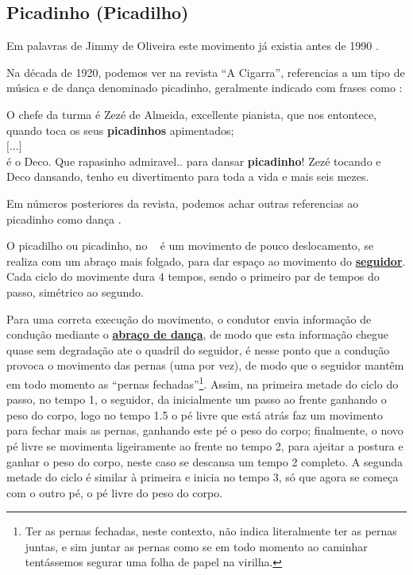 \subsection{ Picadinho (Picadilho)}


Em palavras de Jimmy de Oliveira este movimento já existia antes de 1990 \cite{sambafunkeadoJimmyDeOliveiraPart1}.

Na década de 1920, podemos ver na revista ``A Cigarra'', 
referencias a um tipo de música e de dança denominado picadinho,
geralmente indicado com frases como \cite[pp. 13]{picadinho1}:
\begin{citando}
O chefe da turma é Zezé de Almeida, excellente pianista,
que nos entontece, quando toca os seus \textbf{picadinhos} apimentados;~\\
$[$...$]$~\\
é o Deco. Que rapasinho admiravel.. para dansar \textbf{picadinho}! 
Zezé tocando e Deco dansando, tenho eu divertimento 
para toda a vida e mais seis mezes.
\end{citando}
Em números posteriores da revista, 
podemos achar outras referencias ao picadinho como dança \cite[pp. 52]{picadinho2} \cite[pp. 49]{picadinho3}.

O picadilho ou picadinho, no \AnoLivro~ é um movimento de pouco deslocamento, 
se realiza com um abraço mais folgado, 
para dar espaço ao movimento do \hyperref[def:Seguidor]{\textbf{seguidor}}.
Cada ciclo do movimente dura 4 tempos, sendo o primeiro par de tempos do passo, simétrico ao segundo.

Para uma correta execução do movimento, 
o condutor envia informação de condução mediante o \hyperref[def:abracodedanca]{\textbf{abraço de dança}},
de modo que esta informação chegue quase sem degradação ate o quadril do seguidor,
é nesse ponto que a condução provoca o movimento das pernas (uma por vez), de modo que
o seguidor mantêm em todo momento as ``pernas fechadas''\footnote{
Ter as pernas fechadas, neste contexto, não indica literalmente ter as pernas juntas, 
e sim juntar as pernas como se em todo momento ao caminhar tentássemos segurar uma folha de papel na virilha.}.
Assim, na primeira metade do ciclo do passo, no tempo 1, o seguidor,
da inicialmente um passo ao frente ganhando o peso do corpo, 
logo no tempo 1.5 o pé livre que está atrás faz um movimento para fechar mais as pernas, 
ganhando este pé o peso do corpo; finalmente, o novo pé livre se movimenta ligeiramente ao frente no tempo 2, 
para ajeitar a postura e ganhar o peso do corpo, neste caso se descansa um tempo 2 completo.
A segunda metade do ciclo é similar à primeira e inicia no tempo 3, só que agora se começa com o outro pé, 
o pé livre do peso do corpo.


